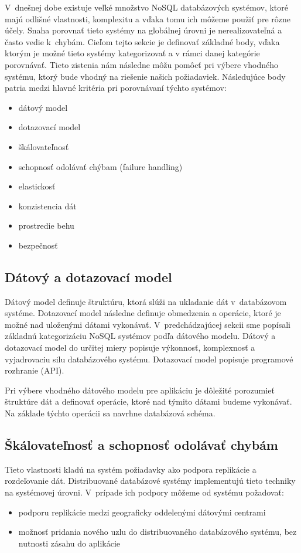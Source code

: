 \documentclass[11pt,twoside,a4paper]{book}
\begin{document}
V~dnešnej dobe existuje veľké množstvo NoSQL databázových systémov, ktoré majú odlišné vlastnosti, komplexitu a vďaka tomu ich môžeme použiť pre rôzne účely. Snaha porovnať tieto systémy na globálnej úrovni je nerealizovateľná a často vedie k~chybám. Cieľom tejto sekcie je definovať základné body, vďaka ktorým je možné tieto systémy kategorizovať a v rámci danej kategórie porovnávať. Tieto zistenia nám následne môžu pomôcť pri výbere vhodného systému, ktorý bude vhodný na riešenie našich požiadaviek. Následujúce body patria medzi hlavné kritéria pri porovnávaní týchto systémov:
\begin{itemize}
 \item
  dátový model
 \item 
  dotazovací model
 \item
  škálovateľnosť
 \item 
  schopnosť odolávať chýbam (failure handling)
 \item
  elastickosť
 \item 
  konzistencia dát
 \item
  prostredie behu
 \item 
  bezpečnosť 
\end{itemize}


\subsection{Dátový a dotazovací model}
Dátový model definuje štruktúru, ktorá slúži na ukladanie dát v~databázovom systéme. Dotazovací model následne definuje obmedzenia a operácie, ktoré je možné nad uloženými dátami vykonávať. V~predchádzajúcej sekcii sme popísali základnú kategorizáciu NoSQL systémov podľa dátového modelu. Dátový a dotazovací model do určitej miery popisuje výkonnosť, komplexnosť a vyjadrovaciu silu databázového systému. Dotazovací model popisuje programové rozhranie (API).

Pri výbere vhodného dátového modelu pre aplikáciu je dôležité porozumieť štruktúre dát a definovať operácie, ktoré nad týmito dátami budeme vykonávať. Na základe týchto operácii sa navrhne databázová schéma.


\subsection{Škálovateľnosť a schopnosť odolávať chybám}
Tieto vlastnosti kladú na systém požiadavky ako podpora replikácie a rozdeľovanie dát. Distribuované databázové systémy implementujú tieto techniky na systémovej úrovni. V~prípade ich podpory môžeme od systému požadovať:
\begin{itemize}
  \item
  podporu replikácie medzi geograficky oddelenými dátovými centrami
  \item
  možnosť pridania nového uzlu do distribuovaného databázového systému, bez nutnosti zásahu do aplikácie
\end{itemize}
\end{document}
